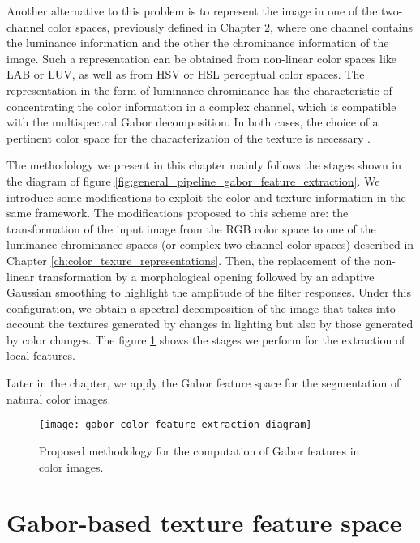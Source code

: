 Another alternative to this problem is to represent the image in one of the two-channel color spaces, previously defined in Chapter 2, where one channel contains the luminance information and the other the chrominance information of the image. Such a representation can be obtained from non-linear color spaces like LAB or LUV, as well as from HSV or HSL perceptual color spaces. The representation in the form of luminance-chrominance has the characteristic of concentrating the color information in a complex channel, which is compatible with the multispectral Gabor decomposition. In both cases, the choice of a pertinent color space for the characterization of the texture is necessary \citep{Qazi.Alata.ea:PR:2011}.

The methodology we present in this chapter mainly follows the stages shown in the diagram of figure \ref{fig:general_pipeline_gabor_feature_extraction}. We introduce some modifications to exploit the color and texture information in the same framework. The modifications proposed to this scheme are: the transformation of the input image from the RGB color space to one of the luminance-chrominance spaces (or complex two-channel color spaces) described in Chapter \ref{ch:color_texure_representations}. Then, the replacement of the non-linear transformation by a morphological opening  followed by an adaptive Gaussian smoothing to highlight the amplitude of the filter responses. Under this configuration, we obtain a spectral decomposition of the image that takes into account the textures generated by changes in lighting but also by those generated by color changes. The figure \ref{fig:proposed_pipeline_gabor_feature_extraction} shows the stages we perform for the extraction of local features.

Later in the chapter, we apply the Gabor feature space for the segmentation of natural color images. 

\begin{figure}[!ht]
	\centering
	\texttt{[image: gabor\_color\_feature\_extraction\_diagram]}
	\caption{Proposed methodology for the computation of Gabor features in color images.}\label{fig:proposed_pipeline_gabor_feature_extraction}
\end{figure}

\section{Gabor-based texture feature space}

